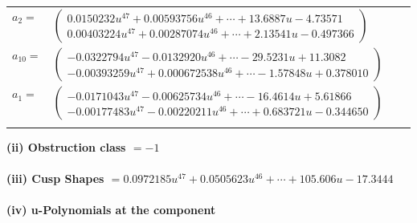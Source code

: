 \documentclass[1p]{elsarticle_modified}
\theoremstyle{definition}
\begin{document}
\begin{tabular}{m{7pt} m{180pt} m{7pt} m{180pt} }
\flushright $a_{2}=$&$\begin{pmatrix}0.0150232 u^{47}+0.00593756 u^{46}+\cdots+13.6887 u-4.73571\\0.00403224 u^{47}+0.00287074 u^{46}+\cdots+2.13541 u-0.497366\end{pmatrix}$ \\
\flushright $a_{10}=$&$\begin{pmatrix}-0.0322794 u^{47}-0.0132920 u^{46}+\cdots-29.5231 u+11.3082\\-0.00393259 u^{47}+0.000672538 u^{46}+\cdots-1.57848 u+0.378010\end{pmatrix}$ \\
\flushright $a_{1}=$&$\begin{pmatrix}-0.0171043 u^{47}-0.00625734 u^{46}+\cdots-16.4614 u+5.61866\\-0.00177483 u^{47}-0.00220211 u^{46}+\cdots+0.683721 u-0.344650\end{pmatrix}$\\&\end{tabular}
\flushleft \textbf{(ii) Obstruction class $= -1$}\\~\\
\flushleft \textbf{(iii) Cusp Shapes $= 0.0972185 u^{47}+0.0505623 u^{46}+\cdots+105.606 u-17.3444$}\\~\\
\newpage\renewcommand{\arraystretch}{1}
\flushleft \textbf{(iv) u-Polynomials at the component}\newline \\
\end{document}
